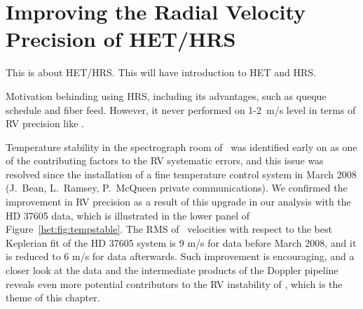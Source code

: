 \chapter{Improving the Radial Velocity Precision of HET/HRS}\label{chap:het}

This is about HET/HRS. This will have introduction to HET and HRS.

Motivation behinding using HRS, including its advantages, such as
queque schedule and fiber feed. However, it never performed on 1-2~m/s
level in terms of RV precision like \keck.

Temperature stability in the spectrograph room of \hrs\ was identified
early on as one of the contributing factors to the RV systematic
errors, and this issue was resolved since the installation of a fine
temperature control system in March 2008 (J.~Bean, L.~Ramsey,
P.~McQueen private communications). We confirmed the improvement in RV
precision as a result of this upgrade in our analysis with the HD
37605 data, which is illustrated in the lower panel of
Figure~\ref{het:fig:tempstable}. The RMS of \hrs\ velocities with
respect to the best Keplerian fit of the HD 37605 system is 9 m/s for
data before March 2008, and it is reduced to 6 m/s for data
afterwards. Such improvement is encouraging, and a closer look at the
data and the intermediate products of the Doppler pipeline reveals
even more potential contributors to the RV instability of \hrs, which
is the theme of this chapter.


